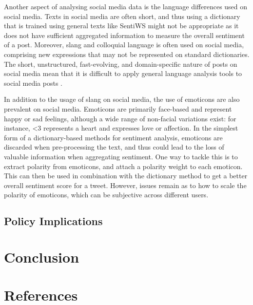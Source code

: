 \documentclass[12pt,onecolumn,twoside]{layout}
\begin{document}
Another aspect of analysing social media data is the language differences used on social media. Texts in social media are often short, and thus using a dictionary that is trained using general texts like SentiWS might not be appropriate as it does not have sufficient aggregated information to measure the overall sentiment of a post. Moreover, slang and colloquial language is often used on social media, comprising new expressions that may not be represented on standard dictionaries. The short, unstructured, fast-evolving, and domain-specific nature of posts on social media mean that it is difficult to apply general language analysis tools to social media posts \cite{Hu2013}. 

In addition to the usage of slang on social media, the use of emoticons are also prevalent on social media. Emoticons are primarily face-based and represent happy or sad feelings, although a wide range
of non-facial variations exist: for instance, <3 represents a heart and expresses love or affection. In the simplest form of a dictionary-based methods for sentiment analysis, emoticons are discarded when pre-processing the text, and thus could lead to the loss of valuable information when aggregating sentiment. One way to tackle this is to extract polarity from emoticons, and attach a polarity weight to each emoticon. This can then be used in combination with the dictionary method to get a better overall sentiment score for a tweet. However, issues remain as to how to scale the polarity of emoticons, which can be subjective across different users. 

\subsection*{Policy Implications} 




\section*{Conclusion} \label{sec:conclusion}



\clearpage
\section*{References}

\end{document}
